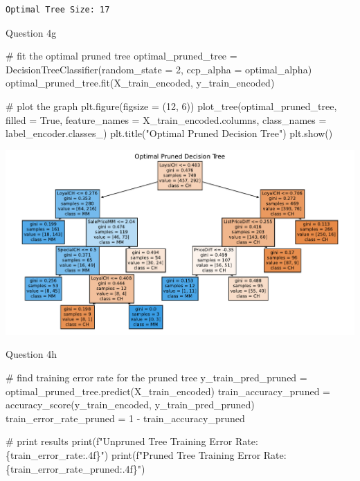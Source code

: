 \documentclass[
  letterpaper,
  DIV=11,
  numbers=noendperiod]{scrartcl}
\newenvironment{Shaded}{\begin{snugshade}}{\end{snugshade}}
\newcommand{\BuiltInTok}[1]{\textcolor[rgb]{0.00,0.23,0.31}{#1}}
\newcommand{\CommentTok}[1]{\textcolor[rgb]{0.37,0.37,0.37}{#1}}
\newcommand{\DecValTok}[1]{\textcolor[rgb]{0.68,0.00,0.00}{#1}}
\newcommand{\NormalTok}[1]{\textcolor[rgb]{0.00,0.23,0.31}{#1}}
\newcommand{\OperatorTok}[1]{\textcolor[rgb]{0.37,0.37,0.37}{#1}}
\newcommand{\SpecialCharTok}[1]{\textcolor[rgb]{0.37,0.37,0.37}{#1}}
\newcommand{\SpecialStringTok}[1]{\textcolor[rgb]{0.13,0.47,0.30}{#1}}
\newcommand{\StringTok}[1]{\textcolor[rgb]{0.13,0.47,0.30}{#1}}
\newcommand{\VariableTok}[1]{\textcolor[rgb]{0.07,0.07,0.07}{#1}}
\begin{document}
\begin{verbatim}
Optimal Tree Size: 17
\end{verbatim}

Question 4g

\begin{Shaded}
\begin{Highlighting}[]
\CommentTok{\# fit the optimal pruned tree }
\NormalTok{optimal\_pruned\_tree }\OperatorTok{=}\NormalTok{ DecisionTreeClassifier(random\_state }\OperatorTok{=} \DecValTok{2}\NormalTok{, ccp\_alpha }\OperatorTok{=}\NormalTok{ optimal\_alpha)}
\NormalTok{optimal\_pruned\_tree.fit(X\_train\_encoded, y\_train\_encoded)}

\CommentTok{\# plot the graph}
\NormalTok{plt.figure(figsize }\OperatorTok{=}\NormalTok{ (}\DecValTok{12}\NormalTok{, }\DecValTok{6}\NormalTok{))}
\NormalTok{plot\_tree(optimal\_pruned\_tree, filled }\OperatorTok{=} \VariableTok{True}\NormalTok{, feature\_names }\OperatorTok{=}\NormalTok{ X\_train\_encoded.columns, }
\NormalTok{          class\_names }\OperatorTok{=}\NormalTok{ label\_encoder.classes\_)}
\NormalTok{plt.title(}\StringTok{"Optimal Pruned Decision Tree"}\NormalTok{)}
\NormalTok{plt.show()}
\end{Highlighting}
\end{Shaded}

\includegraphics{Untitled-1_files/figure-pdf/cell-15-output-1.pdf}

Question 4h

\begin{Shaded}
\begin{Highlighting}[]
\CommentTok{\# find training error rate for the pruned tree}
\NormalTok{y\_train\_pred\_pruned }\OperatorTok{=}\NormalTok{ optimal\_pruned\_tree.predict(X\_train\_encoded)}
\NormalTok{train\_accuracy\_pruned }\OperatorTok{=}\NormalTok{ accuracy\_score(y\_train\_encoded, y\_train\_pred\_pruned)}
\NormalTok{train\_error\_rate\_pruned }\OperatorTok{=} \DecValTok{1} \OperatorTok{{-}}\NormalTok{ train\_accuracy\_pruned}

\CommentTok{\# print results}
\BuiltInTok{print}\NormalTok{(}\SpecialStringTok{f"Unpruned Tree Training Error Rate: }\SpecialCharTok{\{}\NormalTok{train\_error\_rate}\SpecialCharTok{:.4f\}}\SpecialStringTok{"}\NormalTok{)}
\BuiltInTok{print}\NormalTok{(}\SpecialStringTok{f"Pruned Tree Training Error Rate: }\SpecialCharTok{\{}\NormalTok{train\_error\_rate\_pruned}\SpecialCharTok{:.4f\}}\SpecialStringTok{"}\NormalTok{)}
\end{Highlighting}
\end{Shaded}
\end{document}
